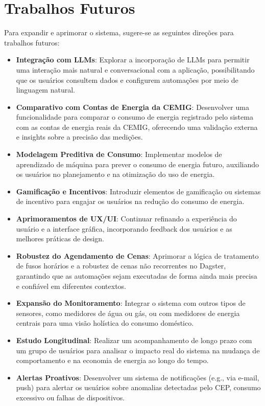 \section{Trabalhos Futuros}
Para expandir e aprimorar o sistema, sugere-se as seguintes direções para trabalhos futuros:
\begin{itemize}
    \item \textbf{Integração com LLMs}: Explorar a incorporação de LLMs para permitir uma interação mais natural e conversacional com a aplicação, possibilitando que os usuários consultem dados e configurem automações por meio de linguagem natural.
    \item \textbf{Comparativo com Contas de Energia da CEMIG}: Desenvolver uma funcionalidade para comparar o consumo de energia registrado pelo sistema com as contas de energia reais da CEMIG, oferecendo uma validação externa e insights sobre a precisão das medições.
    \item \textbf{Modelagem Preditiva de Consumo}: Implementar modelos de aprendizado de máquina para prever o consumo de energia futuro, auxiliando os usuários no planejamento e na otimização do uso de energia.
    \item \textbf{Gamificação e Incentivos}: Introduzir elementos de gamificação ou sistemas de incentivo para engajar os usuários na redução do consumo de energia.
    \item \textbf{Aprimoramentos de UX/UI}: Continuar refinando a experiência do usuário e a interface gráfica, incorporando feedback dos usuários e as melhores práticas de design.
    \item \textbf{Robustez do Agendamento de Cenas}: Aprimorar a lógica de tratamento de fusos horários e a robustez de cenas não recorrentes no Dagster, garantindo que as automações sejam executadas de forma ainda mais precisa e confiável em diferentes contextos.
    \item \textbf{Expansão do Monitoramento}: Integrar o sistema com outros tipos de sensores, como medidores de água ou gás, ou com medidores de energia centrais para uma visão holística do consumo doméstico.
    \item \textbf{Estudo Longitudinal}: Realizar um acompanhamento de longo prazo com um grupo de usuários para analisar o impacto real do sistema na mudança de comportamento e na economia de energia ao longo do tempo.
    \item \textbf{Alertas Proativos}: Desenvolver um sistema de notificações (e.g., via e-mail, push) para alertar os usuários sobre anomalias detectadas pelo CEP, consumo excessivo ou falhas de dispositivos.
\end{itemize}
